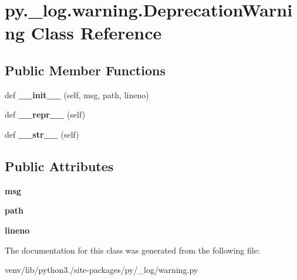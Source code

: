 \hypertarget{classpy_1_1__log_1_1warning_1_1_deprecation_warning}{}\section{py.\+\_\+log.\+warning.\+Deprecation\+Warning Class Reference}
\label{classpy_1_1__log_1_1warning_1_1_deprecation_warning}
\subsection*{Public Member Functions}
\begin{DoxyCompactItemize}
\item 
\mbox{\label{classpy_1_1__log_1_1warning_1_1_deprecation_warning_a3e3c0b6e734b85915ae94fe1cbe35bb1}} 
def {\bfseries \+\_\+\+\_\+init\+\_\+\+\_\+} (self, msg, path, lineno)
\item 
\mbox{\label{classpy_1_1__log_1_1warning_1_1_deprecation_warning_ac48ff87c9e2467815b8669a9ec7e6734}} 
def {\bfseries \+\_\+\+\_\+repr\+\_\+\+\_\+} (self)
\item 
\mbox{\label{classpy_1_1__log_1_1warning_1_1_deprecation_warning_a8082644115482a5df7309c6e800e61bd}} 
def {\bfseries \+\_\+\+\_\+str\+\_\+\+\_\+} (self)
\end{DoxyCompactItemize}
\subsection*{Public Attributes}
\begin{DoxyCompactItemize}
\item 
\mbox{\label{classpy_1_1__log_1_1warning_1_1_deprecation_warning_a86f2803e791e11f861b95daeffa3b2f2}} 
{\bfseries msg}
\item 
\mbox{\label{classpy_1_1__log_1_1warning_1_1_deprecation_warning_a2ff36763577d187e1436a03cef99cce1}} 
{\bfseries path}
\item 
\mbox{\label{classpy_1_1__log_1_1warning_1_1_deprecation_warning_a780090752791a3e372c43e77d5431ed4}} 
{\bfseries lineno}
\end{DoxyCompactItemize}


The documentation for this class was generated from the following file\+:\begin{DoxyCompactItemize}
\item 
venv/lib/python3./site-\/packages/py/\+\_\+log/warning.\+py\end{DoxyCompactItemize}
